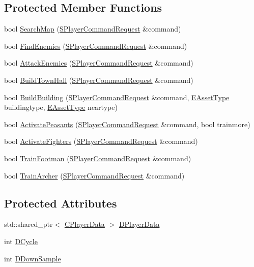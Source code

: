 \subsection*{Protected Member Functions}
\begin{DoxyCompactItemize}
\item 
bool \hyperlink{classCAIPlayer_afafbe8fc589e09a16ae1f02f2794d7b0}{Search\+Map} (\hyperlink{structSPlayerCommandRequest}{S\+Player\+Command\+Request} \&command)
\item 
bool \hyperlink{classCAIPlayer_a33b1533570e7a00114d1b85b3551e395}{Find\+Enemies} (\hyperlink{structSPlayerCommandRequest}{S\+Player\+Command\+Request} \&command)
\item 
bool \hyperlink{classCAIPlayer_adf7feeba7debf9f19b000887616d7bfb}{Attack\+Enemies} (\hyperlink{structSPlayerCommandRequest}{S\+Player\+Command\+Request} \&command)
\item 
bool \hyperlink{classCAIPlayer_a41cdefbe14210fb70b793a32778c5141}{Build\+Town\+Hall} (\hyperlink{structSPlayerCommandRequest}{S\+Player\+Command\+Request} \&command)
\item 
bool \hyperlink{classCAIPlayer_a2ff5263cbaa6bfc62ffec4dbce87ba88}{Build\+Building} (\hyperlink{structSPlayerCommandRequest}{S\+Player\+Command\+Request} \&command, \hyperlink{GameDataTypes_8h_a5600d4fc433b83300308921974477fec}{E\+Asset\+Type} buildingtype, \hyperlink{GameDataTypes_8h_a5600d4fc433b83300308921974477fec}{E\+Asset\+Type} neartype)
\item 
bool \hyperlink{classCAIPlayer_a3fab1c955fd68bb53fa80bb1872d2819}{Activate\+Peasants} (\hyperlink{structSPlayerCommandRequest}{S\+Player\+Command\+Request} \&command, bool trainmore)
\item 
bool \hyperlink{classCAIPlayer_a4216d7e76315234a4fe22fb3a0a89c1d}{Activate\+Fighters} (\hyperlink{structSPlayerCommandRequest}{S\+Player\+Command\+Request} \&command)
\item 
bool \hyperlink{classCAIPlayer_aa3f9c1d0d449a45a24e065d2086527b0}{Train\+Footman} (\hyperlink{structSPlayerCommandRequest}{S\+Player\+Command\+Request} \&command)
\item 
bool \hyperlink{classCAIPlayer_af2edf1e3c54d6af693f768f86d484fd6}{Train\+Archer} (\hyperlink{structSPlayerCommandRequest}{S\+Player\+Command\+Request} \&command)
\end{DoxyCompactItemize}
\subsection*{Protected Attributes}
\begin{DoxyCompactItemize}
\item 
std\+::shared\+\_\+ptr$<$ \hyperlink{classCPlayerData}{C\+Player\+Data} $>$ \hyperlink{classCAIPlayer_a83b5113c8f7e80df54940b647c5ee2e6}{D\+Player\+Data}
\item 
int \hyperlink{classCAIPlayer_adf12a7afe7ea86410b18eff47fa95253}{D\+Cycle}
\item 
int \hyperlink{classCAIPlayer_a091aed92cb9ad1a789900a6394d2f352}{D\+Down\+Sample}
\end{DoxyCompactItemize}


